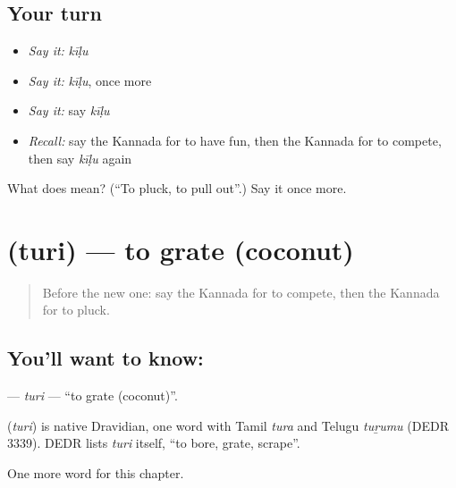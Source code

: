 \subsection*{Your turn}
\begin{itemize}
\raggedright
  \item \emph{Say it:} \emph{kīḷu}
  \item \emph{Say it:} \emph{kīḷu}, once more
  \item \emph{Say it:} say \emph{kīḷu}
  \item \emph{Recall:} say the Kannada for to have fun, then the Kannada for to compete, then say \emph{kīḷu} again
\end{itemize}

\begin{tcolorbox}[breakable,colback=teal!4,colframe=teal!35!black,title={Before you move on}]
What does  mean? (\textquotedblleft{}To pluck, to pull out\textquotedblright{}.) Say it once more.
\end{tcolorbox}
\section[\texorpdfstring{\kn{ತುರಿ} (turi)}{ತುರಿ (turi)}]{ (turi) — to grate (coconut)}

\label{lesson:KA-C205-turi}



\begin{quote}
Before the new one: say the Kannada for to compete, then the Kannada for to pluck.
\end{quote}

\subsection*{You'll want to know: }
\textbf{} — \emph{turi} — \textquotedblleft{}to grate (coconut)\textquotedblright{}.

\begin{cousinweb}
\textbf{} (\emph{turi}) is native Dravidian, one word with Tamil \emph{tura} and Telugu \emph{tuṟumu} (DEDR 3339). DEDR lists \emph{turi} itself, \textquotedblleft{}to bore, grate, scrape\textquotedblright{}.
\end{cousinweb}

\begin{grammarlens}[title={What you've built}]
One more word for this chapter.
\end{grammarlens}

